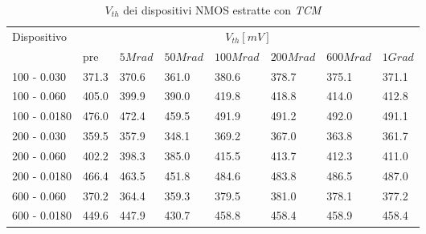 \documentclass[
	a4paper,
	cleardoublepage=empty,
	headings=twolinechapter,
	numbers=autoenddot,
]{scrbook}
\begin{document}
\begin{table}[H]
  \renewcommand{\arraystretch}{1.3}
  \begin{tabular}{m{2.1cm} m{0.8cm} m{1.1cm} m{1.3cm} m{1.5cm} m{1.5cm} m{1.5cm} m{1cm}}
    \toprule
    \multirow{2}{*}{Dispositivo} & \multicolumn{7}{c}{$V_{th} [mV] $}                                                                    \\
    \cmidrule{2-8}
                                 & pre                                & $5Mrad$ & $50Mrad$ & $100Mrad$ & $200Mrad$ & $600Mrad$ & $1Grad$ \\
    \midrule
    100 - 0.030                     & 371.3                              & 370.6   & 361.0    & 380.6     & 378.7     & 375.1     & 371.1        \\
    \hline
    100 - 0.060                     & 405.0                              & 399.9   & 390.0    & 419.8     & 418.8     & 414.0     & 412.8        \\
    \hline
    100 - 0.0180                    & 476.0                              & 472.4   & 459.5    & 491.9     & 491.2     & 492.0     & 491.1        \\
    \hline
    200 - 0.030                     & 359.5                              & 357.9   & 348.1    & 369.2     & 367.0     & 363.8     & 361.7        \\
    \hline
    200 - 0.060                     & 402.2                              & 398.3   & 385.0    & 415.5     & 413.7     & 412.3     &  411.0       \\
    \hline
    200 - 0.0180                    & 466.4                              & 463.5   & 451.8    & 484.6     & 483.8     & 486.5     & 487.0        \\
    \hline
    600 - 0.060                     & 370.2                              & 364.4   & 359.3    & 379.5     & 381.0     & 378.1     & 377.2        \\
    \hline
    600 - 0.0180                    & 449.6                              & 447.9   & 430.7    & 458.8     & 458.4     & 458.9     & 458.4        \\
    \bottomrule
  \end{tabular}
  \caption{$V_{th}$ dei dispositivi NMOS estratte con \emph{TCM}}
  \label{tab:VthTCMN}
\end{table}
\end{document}
